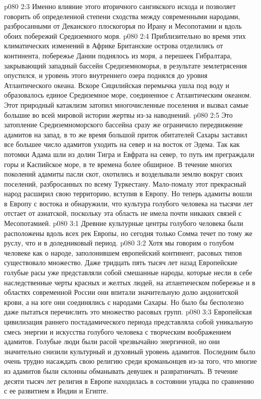 \vs p080 2:3 Именно влияние этого вторичного сангикского исхода и позволяет говорить об определенной степени сходства между современными народами, разбросанными от Деканского плоскогорья по Ирану и Месопотамии и вдоль обоих побережий Средиземного моря.
\vs p080 2:4 \pc Приблизительно во время этих климатических изменений в Африке Британские острова отделились от континента, побережье Дании поднялось из моря, а перешеек Гибралтара, закрывающий западный бассейн Средиземноморья, в результате землетрясения опустился, и уровень этого внутреннего озера поднялся до уровня Атлантического океана. Вскоре Сицилийская перемычка ушла под воду и образовалось единое Средиземное море, соединенное с Атлантическим океаном. Этот природный катаклизм затопил многочисленные поселения и вызвал самые большие во всей мировой истории жертвы из\hyp{}за наводнений.
\vs p080 2:5 Это затопление Средиземноморского бассейна сразу же ограничило передвижение адамитов на запад, в то же время большой приток обитателей Сахары заставил все большее число адамитов уходить на север и на восток от Эдема. Так как потомки Адама шли из долин Тигра и Евфрата на север, то путь им преграждали горы и Каспийское море, в те времена более обширное. В течение многих поколений адамиты пасли скот, охотились и возделывали землю вокруг своих поселений, разбросанных по всему Туркестану. Мало\hyp{}помалу этот прекрасный народ расширил свою территорию, вступив в Европу. Но теперь адамиты вошли в Европу с востока и обнаружили, что культура голубого человека на тысячи лет отстает от азиатской, поскольку эта область не имела почти никаких связей с Месопотамией.
\vs p080 3:1 Древние культурные центры голубого человека были расположены вдоль всех рек Европы, но сегодня только Сомма течет по тому же руслу, что и в доледниковый период.
\vs p080 3:2 Хотя мы говорим о голубом человеке как о народе, заполонившем европейский континент, расовых типов существовало множество. Даже тридцать пять тысяч лет назад Европейские голубые расы уже представляли собой смешанные народы, которые несли в себе наследственные черты красных и желтых людей, на атлантическом побережье и в областях современной России они впитали значительную долю андонитской крови, а на юге они соединялись с народами Сахары. Но было бы бесполезно даже пытаться перечислить это множество расовых групп.
\vs p080 3:3 Европейская цивилизация раннего постадамического периода представляла собой уникальную смесь энергии и искусства голубого человека с творческим воображением адамитов. Голубые люди были расой чрезвычайно энергичной, но они значительно снизили культурный и духовный уровень адамитов. Последним было очень трудно насаждать свою религию среди кроманьонцев из\hyp{}за того, что многие из адамитов были склонны обманывать девушек и развратничать. В течение десяти тысяч лет религия в Европе находилась в состоянии упадка по сравнению с ее развитием в Индии и Египте.
